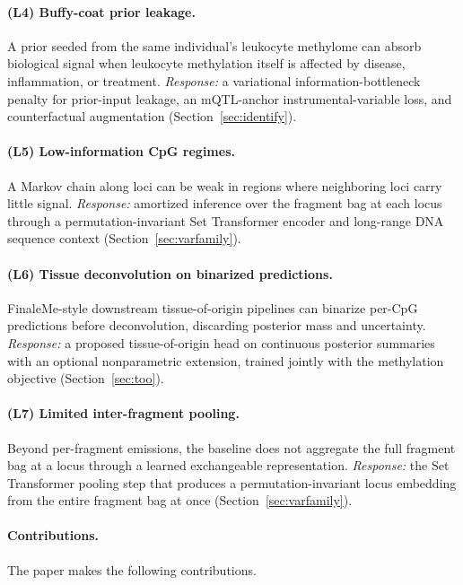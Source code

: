 \paragraph{(L4) Buffy-coat prior leakage.} A prior seeded from the same individual's leukocyte methylome can absorb biological signal when leukocyte methylation itself is affected by disease, inflammation, or treatment. \emph{Response:} a variational information-bottleneck penalty for prior-input leakage, an mQTL-anchor instrumental-variable loss, and counterfactual augmentation (Section~\ref{sec:identify}).

\paragraph{(L5) Low-information CpG regimes.} A Markov chain along loci can be weak in regions where neighboring loci carry little signal. \emph{Response:} amortized inference over the fragment bag at each locus through a permutation-invariant Set Transformer encoder and long-range DNA sequence context (Section~\ref{sec:varfamily}).

\paragraph{(L6) Tissue deconvolution on binarized predictions.} FinaleMe-style downstream tissue-of-origin pipelines can binarize per-CpG predictions before deconvolution, discarding posterior mass and uncertainty. \emph{Response:} a proposed tissue-of-origin head on continuous posterior summaries with an optional nonparametric extension, trained jointly with the methylation objective (Section~\ref{sec:too}).

\paragraph{(L7) Limited inter-fragment pooling.} Beyond per-fragment emissions, the baseline does not aggregate the full fragment bag at a locus through a learned exchangeable representation. \emph{Response:} the Set Transformer pooling step that produces a permutation-invariant locus embedding from the entire fragment bag at once (Section~\ref{sec:varfamily}).

\paragraph{Contributions.} The paper makes the following contributions.

